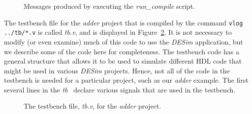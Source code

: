 {\begin{figure}[H]
\begin{center}
        \fi
	\end{center}
          \caption{Messages produced by executing the {\it run\_compile} script.}
	\label{fig:compile}
\end{figure}

The testbench file for the {\it adder} project that is compiled by the command 
\texttt{vlog ../tb/*.v} is called {\it tb.v}, and is displayed in Figure~\ref{fig:tb}. 
It is not necessary to modify (or even examine) much of this code to use the {\it DESim}
application, but we describe some of the code here for completeness.  The testbench code 
has a general structure that allows it to be used to simulate different HDL code that might 
be used in various {\it DESim} projects. Hence, not all of the code in the testbench is 
needed for a particular project, such as our {\it adder} example. The first several lines in 
the {\it tb} \hdlModuleName~declare various signals that are used in the testbench. 

\begin{figure}[H]
\begin{center}
\begin{minipage}[t]{18 cm}
	
\end{minipage}
	\caption{The testbench file, {\it tb.v}, for the {\it adder} project.}
	\label{fig:tb}
\end{center}
\end{figure}

}
